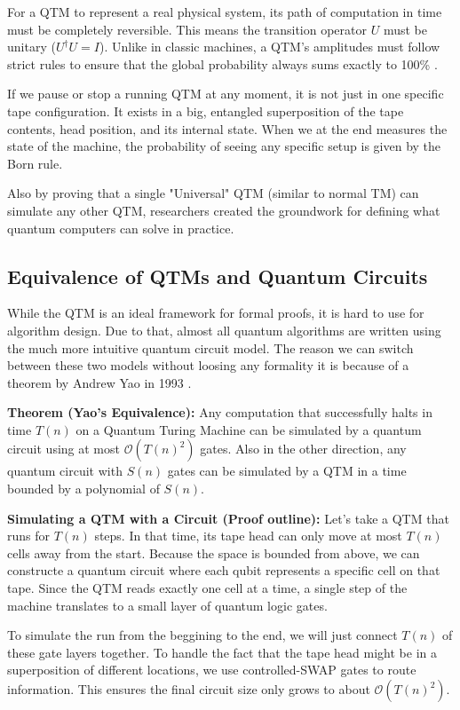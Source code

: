 For a QTM to represent a real physical system, its path of computation in time must be completely reversible. 
This means the transition operator $U$ must be unitary ($U^\dagger U = I$). 
Unlike in classic machines, a QTM's amplitudes must follow strict rules to ensure that the global probability 
always sums exactly to 100\% \cite{bernstein1997}. 
%
%

If we pause or stop a running QTM at any moment, it is not just in one specific tape configuration. 
It exists in a big, entangled superposition of the tape contents, head position, and its internal state. 
When we at the end measures the state of the machine, the probability of seeing any specific setup 
is given by the Born rule. 
%
%

Also by proving that a single "Universal" QTM (similar to normal TM) can simulate any other QTM, 
researchers created the groundwork for defining what quantum computers can solve in practice.

%
%
\subsection{Equivalence of QTMs and Quantum Circuits}
%
%

While the QTM is an ideal framework for formal proofs, it is hard to use for algorithm design. 
Due to that, almost all quantum algorithms are written using the much more intuitive quantum circuit model. 
The reason we can switch between these two models without loosing any formality it is because 
of a theorem by Andrew Yao in 1993 \cite{yao1993}.
%
%

\textbf{Theorem (Yao's Equivalence):} 
Any computation that successfully halts in time $T(n)$ on a Quantum Turing Machine can be simulated by 
a quantum circuit using at most $\mathcal{O}(T(n)^2)$ gates. 
%
%
Also in the other direction, any quantum circuit with $S(n)$ gates can be simulated by a 
QTM in a time bounded by a polynomial of $S(n)$.
%
%


\textbf{Simulating a QTM with a Circuit (Proof outline):}
Let's take a QTM that runs for $T(n)$ steps. 
In that time, its tape head can only move at most $T(n)$ cells away from the start. 
%
%
Because the space is bounded from above, 
we can constructe a quantum circuit where each qubit represents a specific cell on that tape. 
%
%
Since the QTM reads exactly one cell at a time, a single step of the machine translates to a small layer 
of quantum logic gates. 
%
%

To simulate the run from the beggining to the end, we will just connect $T(n)$ of these gate layers together. 
%
%
To handle the fact that the tape head might be in a superposition of different locations, 
we use controlled-SWAP gates to route information. 
%
%
This ensures the final circuit size only grows to about $\mathcal{O}(T(n)^2)$.

